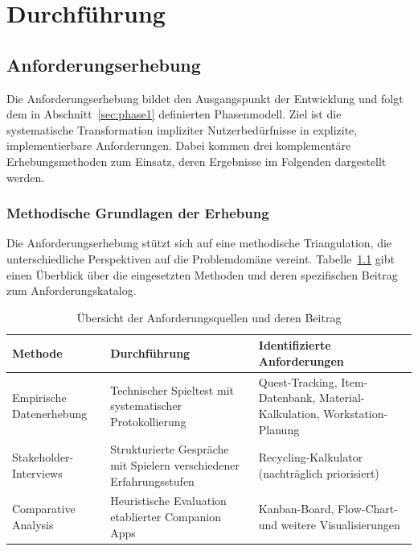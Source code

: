 \chapter{Durchführung}

\section{Anforderungserhebung}
\label{sec:anforderungserhebung}

Die Anforderungserhebung bildet den Ausgangspunkt der Entwicklung und folgt dem in Abschnitt~\ref{sec:phase1} definierten Phasenmodell. Ziel ist die systematische Transformation impliziter Nutzerbedürfnisse in explizite, implementierbare Anforderungen. Dabei kommen drei komplementäre Erhebungsmethoden zum Einsatz, deren Ergebnisse im Folgenden dargestellt werden.

\subsection{Methodische Grundlagen der Erhebung}
\label{sec:erhebungsmethodik}

Die Anforderungserhebung stützt sich auf eine methodische Triangulation, die unterschiedliche Perspektiven auf die Problemdomäne vereint. Tabelle~\ref{tab:anforderungsquellen} gibt einen Überblick über die eingesetzten Methoden und deren spezifischen Beitrag zum Anforderungskatalog.

\begin{table}[htbp]
\centering
\caption{Übersicht der Anforderungsquellen und deren Beitrag}
\label{tab:anforderungsquellen}
\begin{tabular}{p{3.5cm}p{5cm}p{5cm}}
\toprule
\textbf{Methode} & \textbf{Durchführung} & \textbf{Identifizierte Anforderungen} \\
\midrule
Empirische Datenerhebung & Technischer Spieltest mit systematischer Protokollierung & Quest-Tracking, Item-Datenbank, Material-Kalkulation, Workstation-Planung \\
\addlinespace
Stakeholder-Interviews & Strukturierte Gespräche mit Spielern verschiedener Erfahrungsstufen & Recycling-Kalkulator (nachträglich priorisiert) \\
\addlinespace
Comparative Analysis & Heuristische Evaluation etablierter Companion Apps & Kanban-Board, Flow-Chart- und weitere Visualisierungen \\
\bottomrule
\end{tabular}
\end{table}

